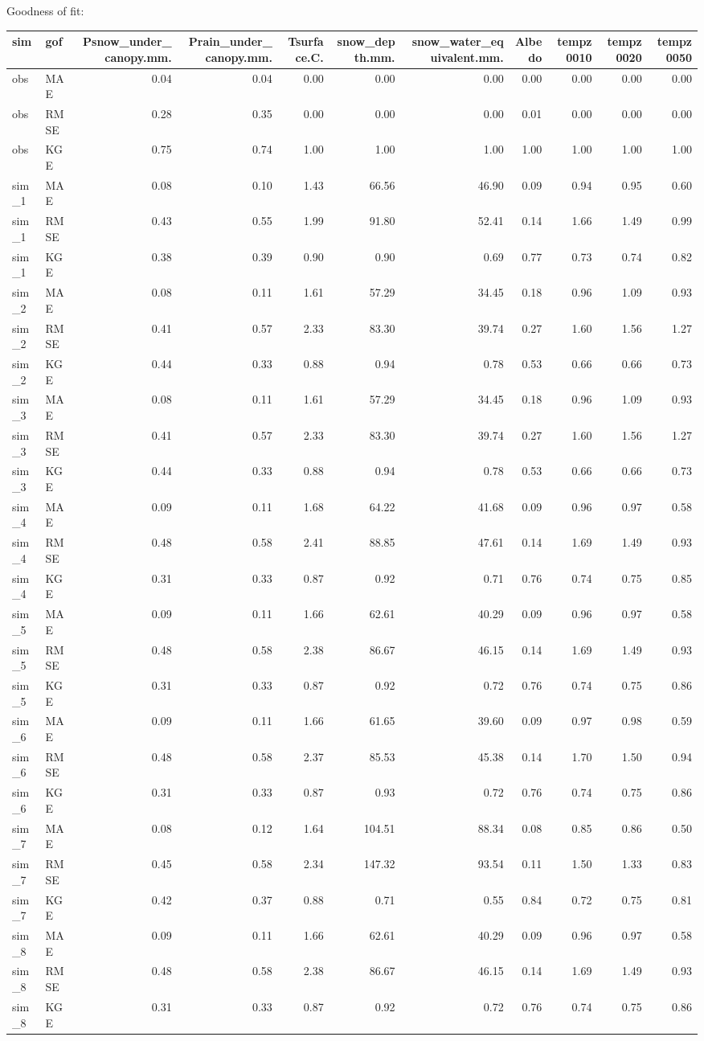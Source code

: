 \documentclass[
]{article}
\begin{document}
Goodness of fit:

\begin{longtable}[]{@{}llrrrrrrrrr@{}}
\toprule
sim & gof & Psnow\_under\_canopy.mm. & Prain\_under\_canopy.mm. &
Tsurface.C. & snow\_depth.mm. & snow\_water\_equivalent.mm. & Albedo &
tempz0010 & tempz0020 & tempz0050\tabularnewline
\midrule
\endhead
obs & MAE & 0.04 & 0.04 & 0.00 & 0.00 & 0.00 & 0.00 & 0.00 & 0.00 &
0.00\tabularnewline
obs & RMSE & 0.28 & 0.35 & 0.00 & 0.00 & 0.00 & 0.01 & 0.00 & 0.00 &
0.00\tabularnewline
obs & KGE & 0.75 & 0.74 & 1.00 & 1.00 & 1.00 & 1.00 & 1.00 & 1.00 &
1.00\tabularnewline
sim\_1 & MAE & 0.08 & 0.10 & 1.43 & 66.56 & 46.90 & 0.09 & 0.94 & 0.95 &
0.60\tabularnewline
sim\_1 & RMSE & 0.43 & 0.55 & 1.99 & 91.80 & 52.41 & 0.14 & 1.66 & 1.49
& 0.99\tabularnewline
sim\_1 & KGE & 0.38 & 0.39 & 0.90 & 0.90 & 0.69 & 0.77 & 0.73 & 0.74 &
0.82\tabularnewline
sim\_2 & MAE & 0.08 & 0.11 & 1.61 & 57.29 & 34.45 & 0.18 & 0.96 & 1.09 &
0.93\tabularnewline
sim\_2 & RMSE & 0.41 & 0.57 & 2.33 & 83.30 & 39.74 & 0.27 & 1.60 & 1.56
& 1.27\tabularnewline
sim\_2 & KGE & 0.44 & 0.33 & 0.88 & 0.94 & 0.78 & 0.53 & 0.66 & 0.66 &
0.73\tabularnewline
sim\_3 & MAE & 0.08 & 0.11 & 1.61 & 57.29 & 34.45 & 0.18 & 0.96 & 1.09 &
0.93\tabularnewline
sim\_3 & RMSE & 0.41 & 0.57 & 2.33 & 83.30 & 39.74 & 0.27 & 1.60 & 1.56
& 1.27\tabularnewline
sim\_3 & KGE & 0.44 & 0.33 & 0.88 & 0.94 & 0.78 & 0.53 & 0.66 & 0.66 &
0.73\tabularnewline
sim\_4 & MAE & 0.09 & 0.11 & 1.68 & 64.22 & 41.68 & 0.09 & 0.96 & 0.97 &
0.58\tabularnewline
sim\_4 & RMSE & 0.48 & 0.58 & 2.41 & 88.85 & 47.61 & 0.14 & 1.69 & 1.49
& 0.93\tabularnewline
sim\_4 & KGE & 0.31 & 0.33 & 0.87 & 0.92 & 0.71 & 0.76 & 0.74 & 0.75 &
0.85\tabularnewline
sim\_5 & MAE & 0.09 & 0.11 & 1.66 & 62.61 & 40.29 & 0.09 & 0.96 & 0.97 &
0.58\tabularnewline
sim\_5 & RMSE & 0.48 & 0.58 & 2.38 & 86.67 & 46.15 & 0.14 & 1.69 & 1.49
& 0.93\tabularnewline
sim\_5 & KGE & 0.31 & 0.33 & 0.87 & 0.92 & 0.72 & 0.76 & 0.74 & 0.75 &
0.86\tabularnewline
sim\_6 & MAE & 0.09 & 0.11 & 1.66 & 61.65 & 39.60 & 0.09 & 0.97 & 0.98 &
0.59\tabularnewline
sim\_6 & RMSE & 0.48 & 0.58 & 2.37 & 85.53 & 45.38 & 0.14 & 1.70 & 1.50
& 0.94\tabularnewline
sim\_6 & KGE & 0.31 & 0.33 & 0.87 & 0.93 & 0.72 & 0.76 & 0.74 & 0.75 &
0.86\tabularnewline
sim\_7 & MAE & 0.08 & 0.12 & 1.64 & 104.51 & 88.34 & 0.08 & 0.85 & 0.86
& 0.50\tabularnewline
sim\_7 & RMSE & 0.45 & 0.58 & 2.34 & 147.32 & 93.54 & 0.11 & 1.50 & 1.33
& 0.83\tabularnewline
sim\_7 & KGE & 0.42 & 0.37 & 0.88 & 0.71 & 0.55 & 0.84 & 0.72 & 0.75 &
0.81\tabularnewline
sim\_8 & MAE & 0.09 & 0.11 & 1.66 & 62.61 & 40.29 & 0.09 & 0.96 & 0.97 &
0.58\tabularnewline
sim\_8 & RMSE & 0.48 & 0.58 & 2.38 & 86.67 & 46.15 & 0.14 & 1.69 & 1.49
& 0.93\tabularnewline
sim\_8 & KGE & 0.31 & 0.33 & 0.87 & 0.92 & 0.72 & 0.76 & 0.74 & 0.75 &
0.86\tabularnewline
\bottomrule
\end{longtable}
\end{document}
